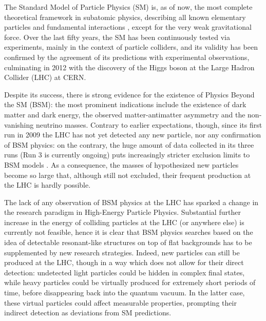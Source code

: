 
The Standard Model of Particle Physics (SM) is, as of now, the most complete theoretical framework in subatomic physics, describing all known elementary particles and fundamental interactions \cite{Glashow-1961, Salam-1964, Weinberg-1967, Fritzsch-1972, Fritzsch-1973, Higgs-1964-1, Higgs-1964-2, Englert-1964, Guralnik-1964}, except for the very weak gravitational force. Over the last fifty years, the SM has been continuously tested via experiments, mainly in the context of particle colliders, and its validity has been confirmed by the agreement of its predictions with experimental observations, culminating in 2012 with the discovery of the Higgs boson \cite{ATLAS-2012, CMS-2012} at the Large Hadron Collider (LHC) at CERN.

Despite its success, there is strong evidence for the existence of Physics Beyond the SM (BSM): the most prominent indications include the existence of dark matter and dark energy, the observed matter-antimatter asymmetry and the non-vanishing neutrino masses. Contrary to earlier expectations, though, since its first run in 2009 the LHC has not yet detected any new particle, nor any confirmation of BSM physics: on the contrary, the huge amount of data collected in its three runs (Run 3 is currently ongoing) puts increasingly stricter exclusion limits to BSM models \cite{CMS-ATLAS-SUSY, Bsekidt-2012, Ghosh-2025, Crivellin-2015}. As a consequence, the masses of hypothesized new particles become so large that, although still not excluded, their frequent production at the LHC is hardly possible.

The lack of any observation of BSM physics at the LHC has sparked a change in the research paradigm in High-Energy Particle Physics. Substantial further increase in the energy of colliding particles at the LHC (or anywhere else) is currently not feasible, hence it is clear that BSM physics searches based on the idea of detectable resonant-like structures on top of flat backgrounds has to be supplemented by new research strategies. Indeed, new particles can still be produced at the LHC, though in a way which does not allow for their direct detection: undetected light particles could be hidden in complex final states, while heavy particles could be virtually produced for extremely short periods of time, before disappearing back into the quantum vacuum. In the latter case, these virtual particles could affect measurable properties, prompting their indirect detection as deviations from SM predictions.

